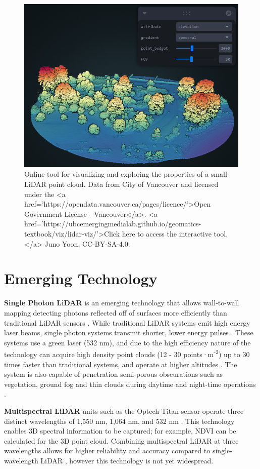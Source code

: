 \documentclass[
]{book}
\begin{document}
\begin{figure}
\includegraphics[width=0.75\linewidth]{images/15-lidar-visualization-static} \caption{Online tool for visualizing and exploring the properties of a small LiDAR point cloud. Data from City of Vancouver and licensed under the <a href='https://opendata.vancouver.ca/pages/licence/'>Open Government License - Vancouver</a>. <a href='https://ubcemergingmedialab.github.io/geomatics-textbook/viz/lidar-viz/'>Click here to access the interactive tool.</a> Juno Yoon, CC-BY-SA-4.0.}\label{fig:15-lidar-visualization-static}
\end{figure}

\section{Emerging Technology}\label{emerging-technology}

\textbf{Single Photon LiDAR} is an emerging technology that allows wall-to-wall mapping detecting photons reflected off of surfaces more efficiently than traditional LiDAR sensors \citep{swatantran_rapid_2016}. While traditional LiDAR systems emit high energy laser beams, single photon systems transmit shorter, lower energy pulses \citep{swatantran_rapid_2016}. These systems use a green laser (532 nm), and due to the high efficiency nature of the technology can acquire high density point clouds (12 - 30 points·m\textsuperscript{-2}) up to 30 times faster than traditional systems, and operate at higher altitudes \citep{swatantran_rapid_2016}. The system is also capable of penetration semi-porous obscurations such as vegetation, ground fog and thin clouds during daytime and night-time operations \citep{swatantran_rapid_2016}.

\textbf{Multispectral LiDAR} units such as the Optech Titan sensor operate three distinct wavelengths of 1,550 nm, 1,064 nm, and 532 nm \citep{morsy_multispectral_2017}. This technology enables 3D spectral information to be captured; for example, NDVI can be calculated for the 3D point cloud. Combining multispectral LiDAR at three wavelengths allows for higher reliability and accuracy compared to single-wavelength LiDAR \citep{morsy_multispectral_2017}, however this technology is not yet widespread.
\end{document}
